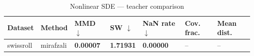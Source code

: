 \begin{table}[ht]
  \centering
  \caption{Nonlinear SDE — teacher comparison}
  \label{tab:nl_teacher_compare}
  \begin{tabular}{lllllll}
    \toprule
    Dataset & Method & MMD $\downarrow$ & SW $\downarrow$ & NaN rate $\downarrow$ & Cov.\,frac. & Mean dist. \\
    \midrule
    swissroll & mirafzali & \textbf{0.00007} & \textbf{1.71931} & \textbf{0.00000} & -- & -- \\
    \bottomrule
  \end{tabular}
\end{table}
